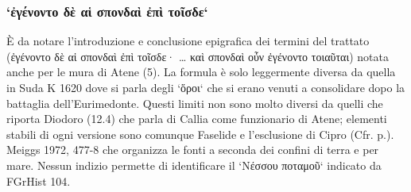{            \subsubsection{`ἐγένοντο δὲ αἱ σπονδαὶ ἐπὶ τοῖσδε`} 
            È da notare l'introduzione e conclusione epigrafica dei termini del trattato (\textgreek{ἐγένοντο δὲ αἱ σπονδαὶ ἐπὶ τοῖσδε·  … καὶ σπονδαὶ οὖν ἐγένοντο τοιαῦται}) notata anche per le mura di Atene (5). La formula è solo leggermente diversa da quella in Suda K 1620 dove si parla degli `ὅροι` che si erano venuti a consolidare dopo la battaglia dell'Eurimedonte. Questi limiti non sono molto diversi da quelli che riporta  Diodoro (12.4) che parla di Callia come funzionario di Atene; elementi stabili di ogni versione sono comunque Faselide e l'esclusione di Cipro (Cfr. p.). Meiggs 1972, 477-8 che organizza le fonti a seconda dei confini di terra e per mare. Nessun indizio permette di identificare il `Νέσσου ποταμοῦ` indicato da FGrHist 104.
}
